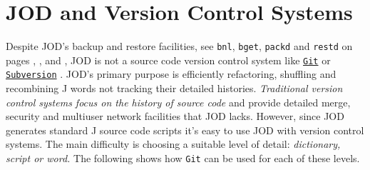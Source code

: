 \section{JOD and Version Control Systems}\label{ap:jodvcsys}

Despite JOD's backup and restore facilities, see \texttt{bnl}, \texttt{bget}, \texttt{packd} and
\texttt{restd} on pages \pageref{ss:bnl}, \pageref{ss:bget}, \pageref{ss:packd} and \pageref{ss:restd}, JOD is not 
a  source code version control system like \href{http://git-scm.com/}{\texttt{Git}} \cite{gitsite} or 
\href{http://subversion.tigris.org/}{\texttt{Subversion}} \cite{subvsite}. 
 JOD's primary
purpose is efficiently  refactoring, shuffling and recombining J words not tracking their detailed histories. 
\emph{Traditional version control systems focus on the history
of source code} and provide detailed  merge, security and multiuser network 
facilities that JOD  lacks.  However, since JOD generates
standard J source code scripts it's easy to use JOD with version control systems. 
The main difficulty is choosing a suitable level of detail: \emph{dictionary, script or word.} 
The following shows how \texttt{Git} can be used for each of these levels.

